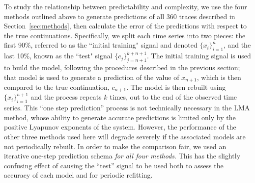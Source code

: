 To study the relationship between predictability and complexity, we
use the four methods outlined above to generate predictions of all 360
traces described in Section~\ref{sec:methods}, then calculate the
error of the predictions with respect to the true continuations.
Specifically, we split each time series into two pieces: the first
90\%, referred to as the ``initial training" signal and denoted
$\{x_i\}_{i=1}^{n}$, and the last 10\%, known as the ``test" signal
$\{c_j\}_{j=n+1}^{k+n+1}$.  The initial training signal is used to
build the model, following the procedures described in the previous
section; that model is used to generate a prediction of the value of
$x_{n+1}$, which is then compared to the true continuation, $c_{n+1}$.
The model is then rebuilt using $\{x_i\}_{i=1}^{n+1}$ and the process
repeats $k$ times, out to the end of the observed time series.  This
``one step prediction'' process is not technically necessary in the
LMA method, whose ability to generate accurate predictions is limited
only by the positive Lyapunov exponents of the system.  However, the
performance of the other three methods used here will degrade severely
if the associated models are not periodically rebuilt.  In order to
make the comparison fair, we used an iterative one-step prediction
schema \emph{for all four methods}.  This has the slightly confusing
effect of causing the ``test'' signal to be used both to assess the
accuracy of each model and for periodic refitting.

